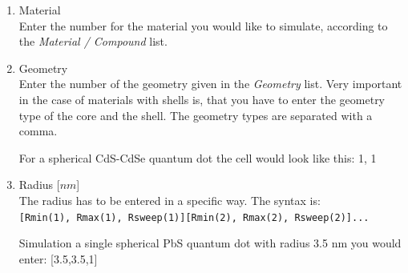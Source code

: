 			\begin{enumerate}
				\item Material		\\
							Enter the number for the material you would like to simulate, according to the {\it Material / Compound} list.
				\item Geometry		\\
							Enter the number of the geometry given in the {\it Geometry} list. Very important in the case of materials with
							shells is, that you have to enter the geometry type of the core and the shell. The geometry types are separated	
							with a comma.
							\begin{EXAMPLE}
								For a spherical CdS-CdSe quantum dot the cell would look like this: 1, 1
							\end{EXAMPLE}
				\item Radius [$nm$]			\\
							The radius has to be entered in a specific way. The syntax is: \\
							\lstinline{[Rmin(1), Rmax(1), Rsweep(1)][Rmin(2), Rmax(2), Rsweep(2)]...} \\
							\newline
							
							\begin{EXAMPLE}
								Simulation a single spherical PbS quantum dot with radius 3.5 nm you would enter: [3.5,3.5,1]
							\end{EXAMPLE}
							

\end{enumerate}
